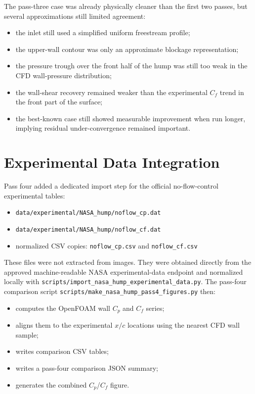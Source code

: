 \documentclass[11pt]{article}
\begin{document}
The pass-three case was already physically cleaner than the first two passes, but several approximations still limited agreement:
\begin{itemize}
\item the inlet still used a simplified uniform freestream profile;
\item the upper-wall contour was only an approximate blockage representation;
\item the pressure trough over the front half of the hump was still too weak in the CFD wall-pressure distribution;
\item the wall-shear recovery remained weaker than the experimental \(C_f\) trend in the front part of the surface;
\item the best-known case still showed measurable improvement when run longer, implying residual under-convergence remained important.
\end{itemize}

\section{Experimental Data Integration}
Pass four added a dedicated import step for the official no-flow-control experimental tables:
\begin{itemize}
\item \texttt{data/experimental/NASA\_hump/noflow\_cp.dat}
\item \texttt{data/experimental/NASA\_hump/noflow\_cf.dat}
\item normalized CSV copies:
  \texttt{noflow\_cp.csv} and \texttt{noflow\_cf.csv}
\end{itemize}

These files were not extracted from images. They were obtained directly from the approved machine-readable NASA experimental-data endpoint and normalized locally with \texttt{scripts/import\_nasa\_hump\_experimental\_data.py}. The pass-four comparison script \texttt{scripts/make\_nasa\_hump\_pass4\_figures.py} then:
\begin{itemize}
\item computes the OpenFOAM wall \(C_p\) and \(C_f\) series;
\item aligns them to the experimental \(x/c\) locations using the nearest CFD wall sample;
\item writes comparison CSV tables;
\item writes a pass-four comparison JSON summary;
\item generates the combined \(C_p\)/\(C_f\) figure.
\end{itemize}
\end{document}
